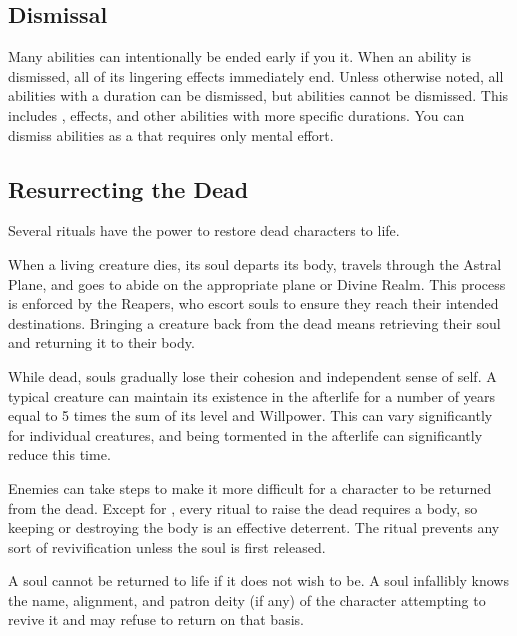   \subsection{Dismissal}\label{Dismissal}
    Many abilities can intentionally be ended early if you  it.
    When an ability is dismissed, all of its lingering effects immediately end.
    Unless otherwise noted, all \magical abilities with a duration can be dismissed, but  abilities cannot be dismissed.
    This includes ,  effects, and other abilities with more specific durations.
    You can dismiss abilities as a  that requires only mental effort.

  \subsection{Resurrecting the Dead}\label{Resurrecting the Dead}
    Several rituals have the power to restore dead characters to life.

    When a living creature dies, its soul departs its body, travels through the Astral Plane, and goes to abide on the appropriate plane or Divine Realm.
    This process is enforced by the Reapers, who escort souls to ensure they reach their intended destinations.
    Bringing a creature back from the dead means retrieving their soul and returning it to their body.

     While dead, souls gradually lose their cohesion and independent sense of self.
    A typical creature can maintain its existence in the afterlife for a number of years equal to 5 times the sum of its level and Willpower.
    This can vary significantly for individual creatures, and being tormented in the afterlife can significantly reduce this time.

     Enemies can take steps to make it more difficult for a character to be returned from the dead.
    Except for , every ritual to raise the dead requires a body, so keeping or destroying the body is an effective deterrent.
    The  ritual prevents any sort of revivification unless the soul is first released.

     A soul cannot be returned to life if it does not wish to be.
    A soul infallibly knows the name, alignment, and patron deity (if any) of the character attempting to revive it and may refuse to return on that basis.

